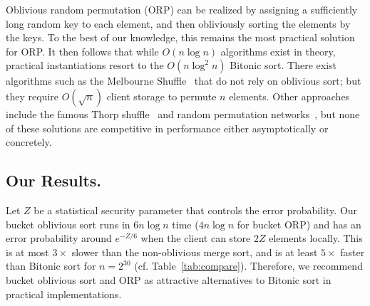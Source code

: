 Oblivious random permutation (ORP) can be realized by assigning a sufficiently long random key to each element, and then obliviously sorting the elements by the keys.
To the best of our knowledge, this remains the most practical solution for ORP.
It then follows that while $O(n \log n)$ algorithms exist in theory, practical instantiations resort to the $O(n \log^2 n)$ Bitonic sort.
There exist algorithms such as the Melbourne
Shuffle~\cite{ohrimenko2014melbourne} that do not rely on
oblivious sort; but they require $O(\sqrt{n})$ client storage to permute $n$ elements.
Other approaches include the famous Thorp shuffle~\cite{thorp01} and random permutation networks~\cite{randpermnet}, but none of these solutions are competitive in performance either asymptotically or concretely.

\subsection{Our Results.}
Let $Z$ be a statistical security parameter that controls the error probability. 
Our bucket oblivious sort runs in $6n\log n$ time ($4n\log n$ for bucket ORP) and has an error probability around $e^{-Z/6}$ when the client can store $2Z$ elements locally.
This is at most $3\times$ slower than the non-oblivious merge sort, and is at least $5\times$ faster than Bitonic sort for $n=2^{30}$ (cf. Table~\ref{tab:compare}).
Therefore, we recommend bucket oblivious sort and ORP as attractive alternatives to Bitonic sort in practical implementations.

